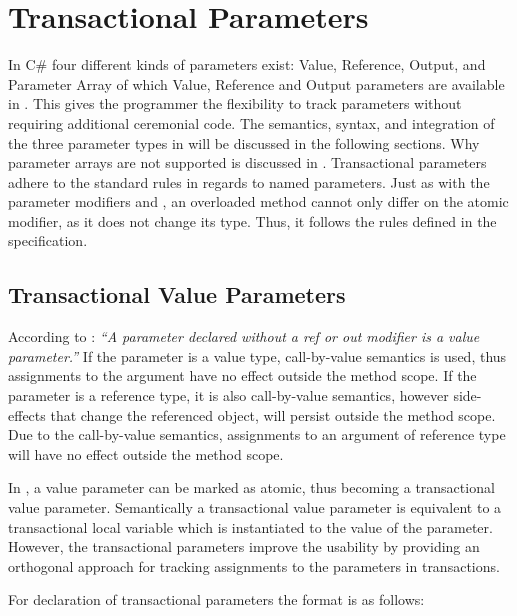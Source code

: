 \section{Transactional Parameters}\label{sec:parameter_design}
In C\# four different kinds of parameters exist: Value, Reference, Output, and Parameter Array of which  Value, Reference and Output parameters are available in  \stmnamesp. This gives the programmer the flexibility to track parameters without requiring additional ceremonial code. The semantics, syntax, and integration of the three parameter types in \stmnamesp will be discussed in the following sections. Why  parameter arrays are not supported is discussed in . Transactional parameters adhere to the standard rules in regards to named parameters\cite[p. 145]{csharp2013specificaiton}. Just as with the parameter modifiers  and , an overloaded method cannot only differ on the atomic modifier, as it does not change its type. Thus, it follows the rules defined in the specification\cite[p. 153-157]{csharp2013specificaiton}.

\subsection{Transactional Value Parameters}
\label{subsec:stm_desgin_value_parameters}
According to \cite[p. 97]{csharp2013specificaiton}: \textit{``A parameter declared without a ref or out modifier is a value parameter.''} If the parameter is a value type, call-by-value semantics is used, thus assignments to the argument have no effect outside the method scope. If the parameter is a reference type, it is also call-by-value semantics, however side-effects that change the referenced object, will persist outside the method scope. Due to the call-by-value semantics, assignments to an argument of reference type will have no effect outside the method scope\cite[p. 76]{sestoft2011c}.

In \stmname, a value parameter can be marked as atomic, thus becoming a transactional value parameter. Semantically a transactional value parameter is equivalent to a transactional local variable which is instantiated to the value of the parameter\cite[p. 76]{sestoft2011c}. However, the transactional parameters improve the usability by providing an orthogonal approach for tracking assignments to the parameters in transactions.

For declaration of transactional parameters the format is as follows:

